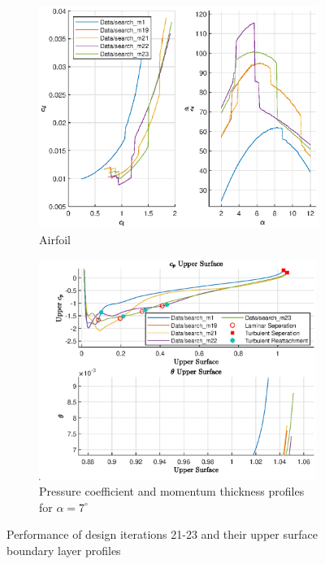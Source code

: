 \documentclass{article}
\begin{document}
\begin{figure}[H]
    \centering
    \begin{subfigure}{0.45\textwidth}
        \centering
        \includegraphics[width=1.2\textwidth, center]{figures/loRe_lod_23.eps}
        \caption{Airfoil}
        \label{fig:m23_lod}
    \end{subfigure}
    \begin{subfigure}{0.54\textwidth}
        \centering
        \includegraphics[width=0.99\textwidth]{figures/loRe_upperprofile_23_a5.eps}
        \caption{Pressure coefficient and momentum thickness profiles for $\alpha = 7^\circ$}
        \label{fig:m23_uprofile}
    \end{subfigure}
    \caption{Performance of design iterations 21-23 and their upper surface boundary layer profiles}
\end{figure}
\end{document}
